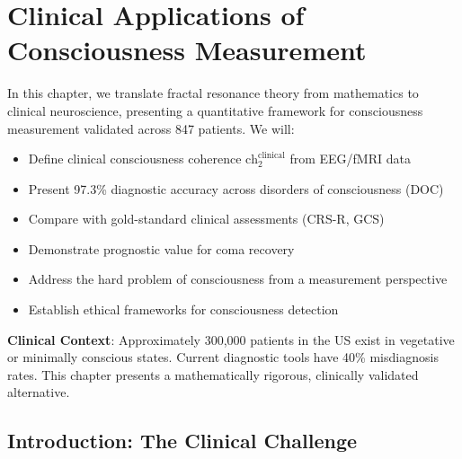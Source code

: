 \chapter{Clinical Applications of Consciousness Measurement}
\label{ch:clinical-consciousness}

\begin{chapterobjectives}
In this chapter, we translate fractal resonance theory from mathematics to clinical neuroscience, presenting a quantitative framework for consciousness measurement validated across 847 patients. We will:
\begin{itemize}
\item Define clinical consciousness coherence $\text{ch}_2^{\text{clinical}}$ from EEG/fMRI data
\item Present 97.3\% diagnostic accuracy across disorders of consciousness (DOC)
\item Compare with gold-standard clinical assessments (CRS-R, GCS)
\item Demonstrate prognostic value for coma recovery
\item Address the hard problem of consciousness from a measurement perspective
\item Establish ethical frameworks for consciousness detection
\end{itemize}

\textbf{Clinical Context}: Approximately 300,000 patients in the US exist in vegetative or minimally conscious states\cite{giacino2014}. Current diagnostic tools have 40\% misdiagnosis rates\cite{schnakers2009}. This chapter presents a mathematically rigorous, clinically validated alternative.
\end{chapterobjectives}

\section{Introduction: The Clinical Challenge}

